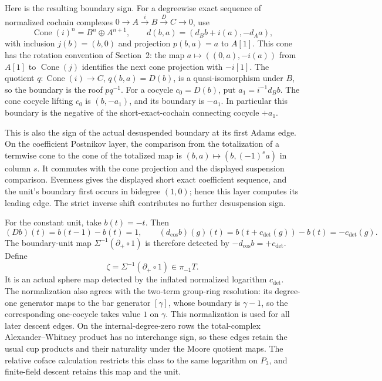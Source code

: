 Here is the resulting boundary sign.  For a degreewise exact sequence
of normalized cochain complexes \(0\to A\xrightarrow{i}B\xrightarrow{D}C\to0\),
use
\[
 \operatorname{Cone}(i)^n=B^n\oplus A^{n+1},\qquad
 d(b,a)=(d_Bb+i(a),-d_Aa),
\]
with inclusion \(j(b)=(b,0)\) and projection \(p(b,a)=a\) to \(A[1]\).
This cone has the rotation convention of Section~2: the map
\(a\mapsto((0,a),-i(a))\) from \(A[1]\) to \(\operatorname{Cone}(j)\)
identifies the next cone projection with \(-i[1]\).
The quotient \(q:\operatorname{Cone}(i)\to C\), \(q(b,a)=D(b)\), is a
quasi-isomorphism under \(B\), so the boundary is the roof \(pq^{-1}\).
For a cocycle \(c_0=D(b)\), put \(a_1=i^{-1}d_Bb\).  The cone cocycle
lifting \(c_0\) is \((b,-a_1)\), and its boundary is \(-a_1\).
In particular this boundary is the negative of the short-exact-cochain
connecting cocycle \(+a_1\).

This is also the sign of the actual desuspended boundary at its first
Adams edge.  On the coefficient Postnikov layer, the comparison from
the totalization of a termwise cone to the cone of the totalized map is
\((b,a)\mapsto(b,(-1)^s a)\) in column \(s\).  It commutes with the cone
projection and the displayed suspension comparison.  Evenness gives
the displayed short exact coefficient sequence, and the unit's boundary
first occurs in bidegree \((1,0)\); hence this layer computes its leading
edge.  The strict inverse shift contributes no further desuspension sign.

For the constant unit, take \(b(t)=-t\).  Then
\[
 (Db)(t)=b(t-1)-b(t)=1,\qquad
 (d_{\mathrm{cos}}b)(g)(t)=b(t+c_{\mathrm{det}}(g))-b(t)=-c_{\mathrm{det}}(g).
\]
The boundary-unit map \(\Sigma^{-1}(\partial_+\circ1)\) is therefore
detected by \(-d_{\mathrm{cos}}b=+c_{\mathrm{det}}\).  Define
\[
 \zeta=\Sigma^{-1}(\partial_+\circ1)\in\pi_{-1}T.
\]
It is an actual sphere map detected by the inflated normalized logarithm
\(c_{\mathrm{det}}\).  The normalization also agrees with the two-term group-ring
resolution: its degree-one generator maps to the bar generator
\([\gamma]\), whose boundary is \(\gamma-1\), so the corresponding
one-cocycle takes value \(1\) on \(\gamma\).
This normalization is used for all later descent edges.  On the
internal-degree-zero rows the total-complex Alexander--Whitney product
has no interchange sign, so these edges retain the usual cup products
and their naturality under the Moore quotient maps.
The relative coface
calculation restricts this class to the same logarithm on \(P_3\), and
finite-field descent retains this map and the unit.


